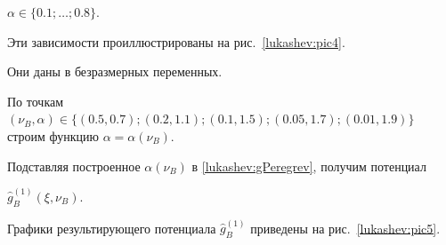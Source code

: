 $\alpha \in \{0.1;\ldots;0.8\}$.

Эти зависимости проиллюстрированы на рис.~\ref{lukashev:pic4}. 

Они даны в безразмерных переменных.



По точкам $(\nu_B, \alpha) \in \{ (0.5, 0.7);  (0.2, 1.1); (0.1, 1.5); (0.05, 1.7); 

(0.01, 1.9)\}$ \linebreak строим функцию $\alpha=\alpha(\nu_B)$. 

Подставляя построенное $\alpha(\nu_B)$ в \eqref{lukashev:gPeregrev}, получим потенциал 

$\widehat{g}^{(1)}_B(\xi, \nu_B)$. 

Графики результирующего потенциала $\widehat{g}^{(1)}_B$ приведены на рис.~\ref{lukashev:pic5}.







